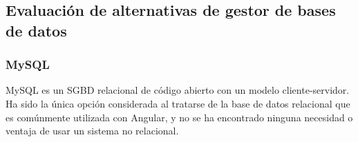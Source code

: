\subsection{Evaluación de alternativas de gestor de bases de datos} 
\subsubsection{MySQL}
MySQL es un SGBD relacional de código abierto con un modelo cliente-servidor. Ha sido la única opción considerada al tratarse de la base de datos relacional que es comúnmente utilizada con Angular, y no se ha encontrado ninguna necesidad o ventaja de usar un sistema no relacional.